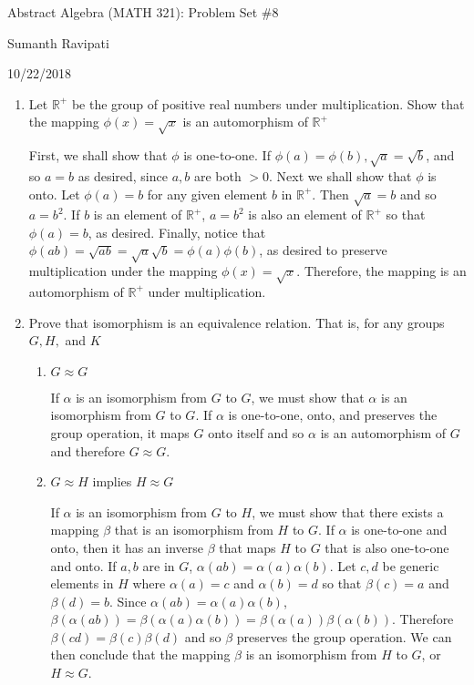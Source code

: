 \documentclass{article}
\newcommand{\R}{\mathbb R}
\begin{document}
%
\centerline{\Large Abstract Algebra (MATH 321): Problem Set \#8}
\centerline{Sumanth Ravipati}
\centerline{10/22/2018}

\begin{enumerate}
    \item Let $\R^+$ be the group of positive real numbers under multiplication. Show that the mapping $\phi(x) = \sqrt{x}$ is an automorphism of $\R^+$
    \begin{flushleft}
    First, we shall show that $\phi$ is one-to-one. If $\phi(a) = \phi(b), \sqrt{a} = \sqrt{b}$, and so $a = b$ as desired, since $a, b$ are both $> 0$. Next we shall show that $\phi$ is onto. Let $\phi(a) = b$ for any given element $b$ in $\R^+$. Then $\sqrt{a} = b$ and so $a = b^2$. If $b$ is an element of $\R^+$, $a = b^2$ is also an element of $\R^+$ so that $\phi(a) = b$, as desired. Finally, notice that $\phi(ab) = \sqrt{ab} = \sqrt{a}\sqrt{b} = \phi(a)\phi(b)$, as desired to preserve multiplication under the mapping $\phi(x) = \sqrt{x}$. Therefore, the mapping is an automorphism of $\R^+$ under multiplication.
    \end{flushleft}
    \item Prove that isomorphism is an equivalence relation. That is, for any groups $G , H ,$ and $K$
    \begin{enumerate}
        \item $G \approx G$
        \begin{flushleft}
        If $\alpha$ is an isomorphism from $G$ to $G$, we must show that $\alpha$ is an isomorphism from $G$ to $G$. If $\alpha$ is one-to-one, onto, and preserves the group operation, it maps $G$ onto itself and so $\alpha$ is an automorphism of $G$ and therefore $G \approx G$.
        \end{flushleft}
        \item $G \approx H$ implies $H \approx G$
        \begin{flushleft}
        If $\alpha$ is an isomorphism from $G$ to $H$, we must show that there exists a mapping $\beta$ that is an isomorphism from $H$ to $G$. If $\alpha$ is one-to-one and onto, then it has an inverse $\beta$ that maps $H$ to $G$ that is also one-to-one and onto. If $a, b$ are in $G$, $\alpha(ab) = \alpha(a)\alpha(b)$. Let $c, d$ be generic elements in $H$ where $\alpha(a) = c$ and $\alpha(b) = d$ so that $\beta(c) = a$ and $\beta(d) = b$. Since $\alpha(ab) = \alpha(a)\alpha(b)$, $\beta(\alpha(ab)) = \beta(\alpha(a)\alpha(b)) = \beta(\alpha(a))\beta(\alpha(b))$. Therefore $\beta(cd) = \beta(c)\beta(d)$ and so $\beta$ preserves the group operation. We can then conclude that the mapping $\beta$ is an isomorphism from $H$ to $G$, or $H \approx G$.

\end{flushleft}
\end{enumerate}
\end{enumerate}
\end{document}
